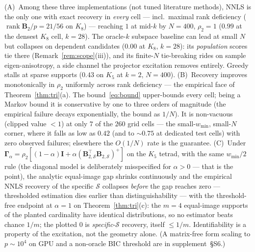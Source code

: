 \documentclass{article}
\DeclareMathOperator{\rank}{rank}
\newcommand{\B}{\bm{B}}
\newcommand{\Scal}{\mathcal{S}}
\newcommand{\Gam}{\bm{\Gamma}}
\begin{document}
(A)~Among these three implementations (not tuned literature methods), NNLS is
the only one with exact recovery in \emph{every} cell --- incl.\ maximal rank
deficiency ($\rank\B_2/p=21/56$ on $K_8$) --- reaching $1$ at mid-$k$ by
$N{=}400$, $\rho_2{=}1$ ($0.99$ at the densest $K_8$ cell, $k{=}28$). The
oracle-$k$ subspace baseline can lead at small $N$ but
collapses on dependent candidates ($0.00$ at $K_8$, $k{=}28$): its
\emph{population} scores tie there (Remark~\ref{rem:scope}(iii)), and its
finite-$N$ tie-breaking rides on sample eigen-anisotropy, a side channel the
projector excitation removes entirely. Greedy stalls at sparse supports
($0.43$ on $K_5$ at $k{=}2$, $N{=}400$). (B)~Recovery improves
monotonically in $\rho_2$ uniformly across rank deficiency --- the empirical
face of Theorem~\ref{thm:tri}(a). The bound~\eqref{eq:bound} upper-bounds
every cell; being a Markov bound it is conservative by one to three orders
of magnitude (the empirical failure decays exponentially, the bound as
$1/N$). It is non-vacuous (clipped value $<1$) at only $7$ of the $260$ grid
cells --- the small-$w_{\min}$, small-$N$ corner, where it falls as low as
$0.42$ (and to ${\sim}0.75$ at dedicated test cells) with zero observed
failures; elsewhere the $O(1/N)$ rate is the guarantee. (C)~Under
$\Gam_\alpha=\rho_2[(1-\alpha)\bm I+\alpha(\B_{2,\Scal}^{\!\top}\B_{2,\Scal})^{+}]$
on the $K_5$ tetrad, with the same $w_{\min}/2$ rule (the diagonal model is
deliberately misspecified for $\alpha>0$ --- that is the point), the
analytic equal-image gap shrinks continuously and the empirical NNLS
recovery of the specific $\Scal$ collapses \emph{before} the gap reaches
zero --- thresholded estimation dies earlier than distinguishability ---
with the threshold-free endpoint at $\alpha=1$ on Theorem~\ref{thm:tri}(c):
the $m{=}4$ equal-image supports of the planted cardinality have identical
distributions, so no estimator beats chance $1/m$; the plotted $0$ is
\emph{specific}-$\Scal$ recovery, itself $\le1/m$. Identifiability is a property of the excitation, not the geometry
alone. (A matrix-free form scaling to $p{\sim}10^4$ on GPU and a non-oracle BIC
threshold are in supplement~\S S6.)
\end{document}
